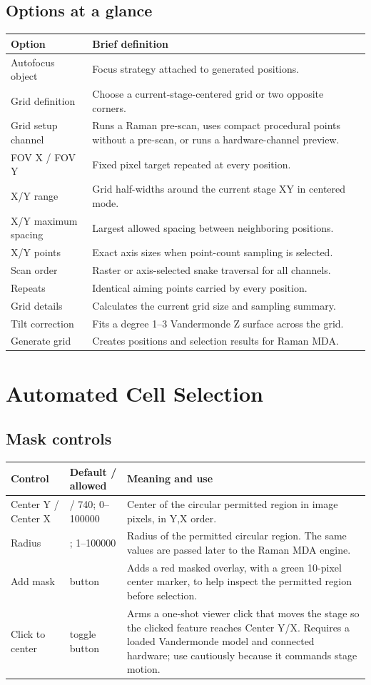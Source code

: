\documentclass[11pt,oneside]{report}
\makeatletter
\newcommand{\fieldtable}{\begin{longtable}{@{}>{\raggedright\arraybackslash}p{0.25\textwidth}>{\raggedright\arraybackslash}p{0.18\textwidth}>{\raggedright\arraybackslash}p{0.50\textwidth}@{}}\toprule\textbf{Control} & \textbf{Default / allowed} & \textbf{Meaning and use}\\\midrule\endhead}
\newcommand{\endfieldtable}{\bottomrule\end{longtable}}
\makeatother
\begin{document}
\section*{Options at a glance}
\begin{longtable}{@{}p{}p{}@{}}
\toprule\textbf{Option} & \textbf{Brief definition}\\\midrule
Autofocus object & Focus strategy attached to generated positions.\\
Grid definition & Choose a current-stage-centered grid or two opposite corners.\\
Grid setup channel & Runs a Raman pre-scan, uses compact procedural points without a pre-scan,
or runs a hardware-channel preview.\\
FOV X / FOV Y & Fixed pixel target repeated at every position.\\
X/Y range & Grid half-widths around the current stage XY in centered mode.\\
X/Y maximum spacing & Largest allowed spacing between neighboring positions.\\
X/Y points & Exact axis sizes when point-count sampling is selected.\\
Scan order & Raster or axis-selected snake traversal for all channels.\\
Repeats & Identical aiming points carried by every position.\\
Grid details & Calculates the current grid size and sampling summary.\\
Tilt correction & Fits a degree 1--3 Vandermonde Z surface across the grid.\\
Generate grid & Creates positions and selection results for Raman MDA.\\
\bottomrule\end{longtable}

\chapter{Automated Cell Selection}

\section{Mask controls}
\fieldtable
Center Y / Center X & 540 / 740; 0--100000 & Center of the circular permitted region
in image pixels, in Y,X order.\\
Radius & 100; 1--100000 & Radius of the permitted circular region. The same values
are passed later to the Raman MDA engine.\\
Add mask & button & Adds a red masked overlay, with a green 10-pixel center marker,
to help inspect the permitted region before selection.\\
Click to center & toggle button & Arms a one-shot viewer click that moves the stage
so the clicked feature reaches Center Y/X. Requires a loaded Vandermonde model and
connected hardware; use cautiously because it commands stage motion.\\
\endfieldtable
\end{document}
